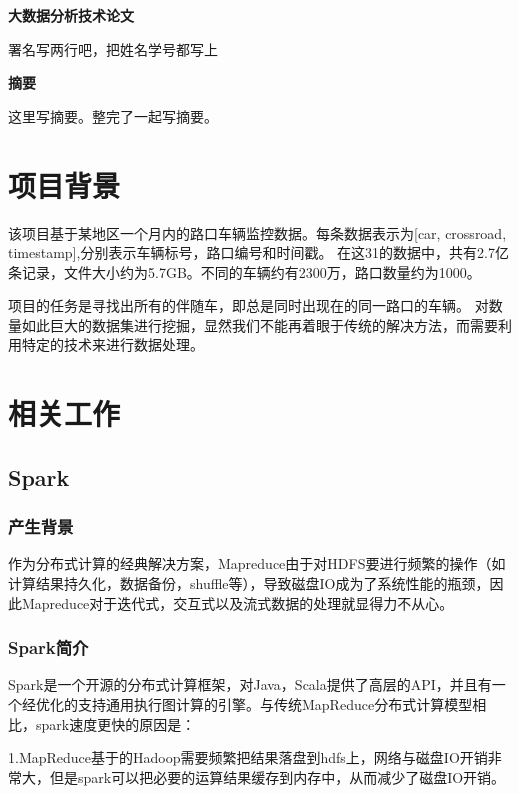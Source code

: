 \documentclass[CJK]{ctexart}
\begin{document}
\begin{center}
{\LARGE \textbf {大数据分析技术论文}}
\end{center}

\begin{center}
署名写两行吧，把姓名学号都写上
\newline
\end{center}
\setlength{\columnsep}{1cm}
\begin{multicols}{2}
\begin{center}
{\large \textbf {摘要}}
\end{center}
    这里写摘要。整完了一起写摘要。
\section{项目背景}
{\normalsize {
    该项目基于某地区一个月内的路口车辆监控数据。每条数据表示为[car, crossroad, timestamp],分别表示车辆标号，路口编号和时间戳。
    在这31的数据中，共有2.7亿条记录，文件大小约为5.7GB。不同的车辆约有2300万，路口数量约为1000。

    项目的任务是寻找出所有的伴随车，即总是同时出现在的同一路口的车辆。
    对数量如此巨大的数据集进行挖掘，显然我们不能再着眼于传统的解决方法，而需要利用特定的技术来进行数据处理。

}}
\section{相关工作}
\subsection{Spark}
\subsubsection{产生背景}
    作为分布式计算的经典解决方案，Mapreduce由于对HDFS要进行频繁的操作（如计算结果持久化，数据备份，shuffle等），导致磁盘IO成为了系统性能的瓶颈，因此Mapreduce对于迭代式，交互式以及流式数据的处理就显得力不从心。
\subsubsection{Spark简介}
Spark是一个开源的分布式计算框架，对Java，Scala提供了高层的API，并且有一个经优化的支持通用执行图计算的引擎。与传统MapReduce分布式计算模型相比，spark速度更快的原因是：

1.MapReduce基于的Hadoop需要频繁把结果落盘到hdfs上，网络与磁盘IO开销非常大，但是spark可以把必要的运算结果缓存到内存中，从而减少了磁盘IO开销。


\end{multicols}
\end{document}
